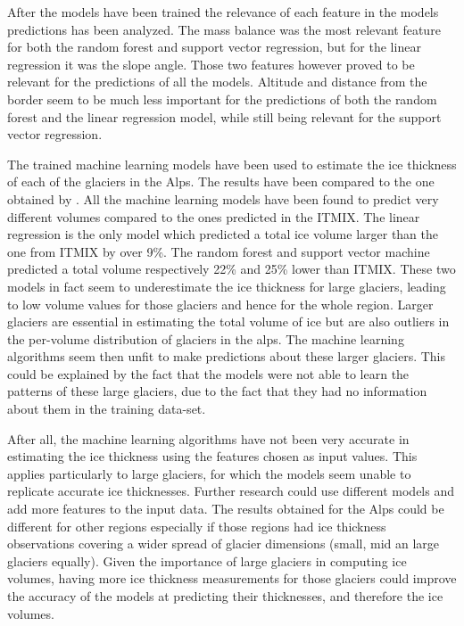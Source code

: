 After the models have been trained the relevance of each feature in the models predictions has been analyzed. The mass balance was the most relevant feature for both the random forest and support vector regression, but for the linear regression it was the slope angle. Those two features however proved to be relevant for the predictions of all the models. Altitude and distance from the border seem to be much less important for the predictions of both the random forest and the linear regression model, while still being relevant for the support vector regression.

The trained machine learning models have been used to estimate the ice thickness of each of the glaciers in the Alps. The results have been compared to the one obtained by \citet{Farinotti2019}. All the machine learning models have been found to predict very different volumes compared to the ones predicted in the ITMIX. The linear regression is the only model which predicted a total ice volume larger than the one from ITMIX by over 9\%. The random forest and support vector machine predicted a total volume respectively 22\% and 25\% lower than ITMIX. These two models in fact seem to underestimate the ice thickness for large glaciers, leading to low volume values for those glaciers and hence for the whole region. Larger glaciers are essential in estimating the total volume of ice but are also outliers in the per-volume distribution of glaciers in the alps. The machine learning algorithms seem then unfit to make predictions about these larger glaciers. This could be explained by the fact that the models were not able to learn the patterns of these large glaciers, due to the fact that they had no information about them in the training data-set. 

After all, the machine learning algorithms have not been very accurate in estimating the ice thickness using the features chosen as input values. This applies particularly to large glaciers, for which the models seem unable to replicate accurate ice thicknesses.
Further research could use different models and add more features to the input data.
The results obtained for the Alps could be different for other regions especially if those regions had ice thickness observations covering a wider spread of glacier dimensions (small, mid an large glaciers equally).
Given the importance of large glaciers in computing ice volumes, having more ice thickness measurements for those glaciers could improve the accuracy of the models at predicting their thicknesses, and therefore the ice volumes.
